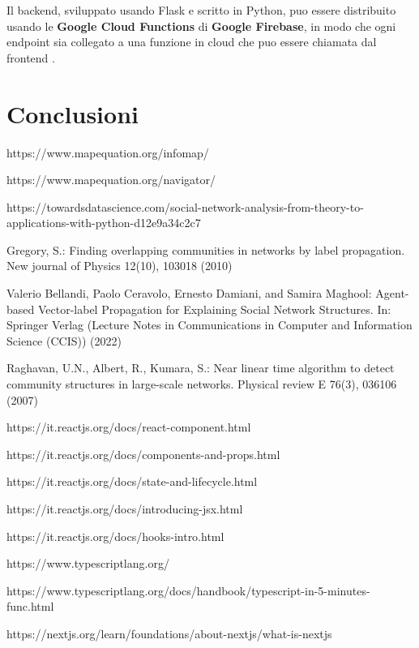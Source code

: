 \documentclass[a4paper,12pt]{report}
\begin{document}
	Il backend, sviluppato usando Flask e scritto in Python, puo essere distribuito usando le \textbf{Google Cloud Functions} di \textbf{Google Firebase}, in modo che ogni endpoint sia collegato a una funzione in cloud che puo essere chiamata dal frontend \cite{googlecloudfunctions}.

\chapter{Conclusioni}

%
%
\begin{thebibliography}{0}
%
https://www.mapequation.org/infomap/

https://www.mapequation.org/navigator/

https://towardsdatascience.com/social-network-analysis-from-theory-to-applications-with-python-d12e9a34c2c7

Gregory, S.: Finding overlapping communities in networks by label propagation.
New journal of Physics 12(10), 103018 (2010)

Valerio Bellandi, Paolo Ceravolo, Ernesto Damiani, and Samira Maghool: Agent-based Vector-label Propagation for Explaining Social Network Structures. In: Springer Verlag (Lecture Notes in Communications in Computer and Information Science (CCIS)) (2022)

Raghavan, U.N., Albert, R., Kumara, S.: Near linear time algorithm to detect
community structures in large-scale networks. Physical review E 76(3), 036106
(2007)

https://it.reactjs.org/docs/react-component.html

https://it.reactjs.org/docs/components-and-props.html

https://it.reactjs.org/docs/state-and-lifecycle.html

https://it.reactjs.org/docs/introducing-jsx.html

https://it.reactjs.org/docs/hooks-intro.html

https://www.typescriptlang.org/

https://www.typescriptlang.org/docs/handbook/typescript-in-5-minutes-func.html

https://nextjs.org/learn/foundations/about-nextjs/what-is-nextjs


\end{thebibliography}
\end{document}
